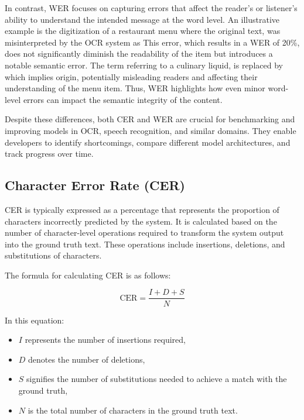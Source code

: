 In contrast, WER focuses on capturing errors that affect the reader's or listener's ability to understand the intended message at the word level. An illustrative example is the digitization of a restaurant menu where the original text,  was misinterpreted by the OCR system as  This error, which results in a WER of 20\%, does not significantly diminish the readability of the item but introduces a notable semantic error. The term  referring to a culinary liquid, is replaced by  which implies origin, potentially misleading readers and affecting their understanding of the menu item. Thus, WER highlights how even minor word-level errors can impact the semantic integrity of the content.

Despite these differences, both CER and WER are crucial for benchmarking and improving models in OCR, speech recognition, and similar domains. They enable developers to identify shortcomings, compare different model architectures, and track progress over time.

\subsection{Character Error Rate (CER)}
\label{subsec:5_cer}
CER is typically expressed as a percentage that represents the proportion of characters incorrectly predicted by the system. It is calculated based on the number of character-level operations required to transform the system output into the ground truth text. These operations include insertions, deletions, and substitutions of characters.

The formula for calculating CER is as follows:

\begin{equation}
    \text{CER} = \frac{I+D+S}{N}
\end{equation}

In this equation:
\begin{itemize}
    \item $I$ represents the number of insertions required,
    \item $D$ denotes the number of deletions,
    \item $S$ signifies the number of substitutions needed to achieve a match with the ground truth,
    \item $N$ is the total number of characters in the ground truth text.
\end{itemize}

